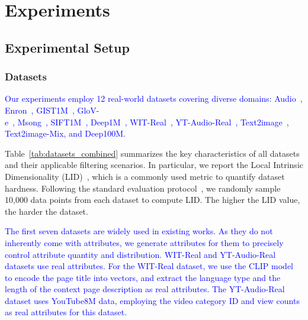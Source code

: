\documentclass[sigconf, nonacm]{acmart}
\begin{document}
{%
	
	\section{Experiments}
	\subsection{Experimental Setup}
	\subsubsection{Datasets}
	
	\textcolor{blue}{Our experiments employ 12 real-world datasets covering diverse domains: Audio~\cite{audio_unknown},  Enron~\cite{enron2015}, GIST1M~\cite{sift2010}, GloV-\\e~\cite{GloVe2015}, Msong~\cite{msong2011}, SIFT1M~\cite{sift2010}, Deep1M~\cite{yandex_deep_dataset}, WIT-Real~\cite{wit_dataset}, YT-Audio-Real~\cite{youtube8m_dataset}, Text2image~\cite{texttoimage}, Text2image-Mix, and Deep100M.}
	
	Table~\ref{tab:datasets_combined} summarizes the key characteristics of all datasets and their applicable filtering scenarios. In particular, we report the Local Intrinsic Dimensionality (LID)~\cite{Lid}, which is a commonly used metric to quantify dataset hardness. Following the standard evaluation protocol~\cite{LID2}, we randomly sample 10,000 data points from each dataset to compute LID. The higher the LID value, the harder the dataset.
	
	\textcolor{blue}{The first seven datasets are widely used in existing works. As they do not inherently come with attributes, we generate attributes for them to precisely control attribute quantity and distribution. WIT-Real and YT-Audio-Real datasets use real attributes. For the WIT-Real dataset, we use the CLIP model to encode the page title into vectors, and extract the language type and the length of the context page description  as real attributes. The YT-Audio-Real dataset uses YouTube8M data, employing the video category ID and view counts as real attributes for this dataset.}
	
}
\end{document}
